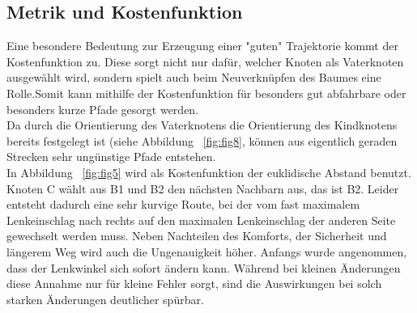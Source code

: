 \subsection{Metrik und Kostenfunktion}
Eine besondere Bedeutung zur Erzeugung einer "guten" Trajektorie kommt der Kostenfunktion zu. Diese sorgt nicht nur dafür, welcher Knoten als Vaterknoten ausgewählt wird, sondern spielt auch beim Neuverknüpfen des Baumes eine Rolle.Somit kann mithilfe der Kostenfunktion für besonders gut abfahrbare oder besonders kurze Pfade gesorgt werden. \\
Da durch die Orientierung des Vaterknotens die Orientierung des Kindknotens bereits festgelegt ist (siehe Abbildung ~\ref{fig:fig8}, können aus eigentlich geraden Strecken sehr ungünstige Pfade entstehen.\\
 In Abbildung ~\ref{fig:fig5} wird als Kostenfunktion der euklidische Abstand benutzt. Knoten C wählt aus B1 und B2 den nächsten Nachbarn aus, das ist B2. Leider entsteht dadurch eine sehr kurvige Route, bei der vom fast maximalem Lenkeinschlag nach rechts auf den maximalen Lenkeinschlag der anderen Seite gewechselt werden muss. Neben Nachteilen des Komforts, der Sicherheit und längerem Weg wird auch die Ungenauigkeit höher. Anfangs wurde angenommen, dass der Lenkwinkel sich sofort ändern kann. Während bei kleinen Änderungen diese Annahme nur für kleine Fehler sorgt, sind die Auswirkungen bei solch starken Änderungen deutlicher spürbar.


